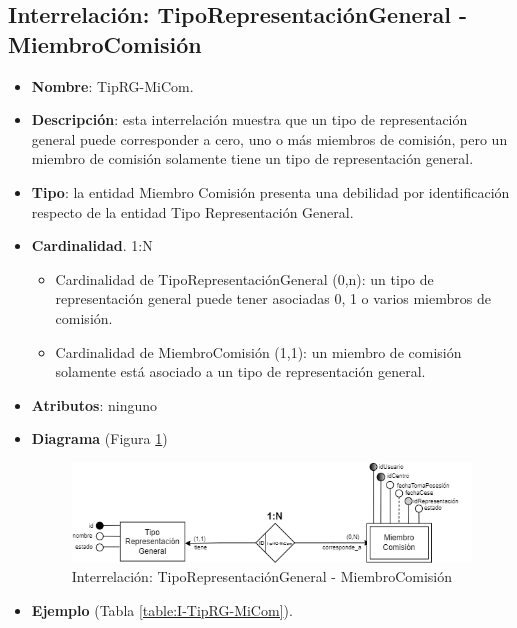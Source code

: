 \subsection{Interrelación: TipoRepresentaciónGeneral - MiembroComisión}
\begin{itemize}
    \item \textbf{Nombre}: TipRG-MiCom.
    \item \textbf{Descripción}: esta interrelación muestra que un tipo de representación general puede corresponder a cero, uno o más miembros de comisión, pero un miembro de comisión solamente tiene un tipo de representación general.
    \item \textbf{Tipo}: la entidad Miembro Comisión presenta una debilidad por identificación respecto de la entidad Tipo Representación General.
    \item \textbf{Cardinalidad}. 1:N
    \begin{itemize}
        \item Cardinalidad de TipoRepresentaciónGeneral (0,n): un tipo de representación general puede tener asociadas 0, 1 o varios miembros de comisión.
        \item Cardinalidad de MiembroComisión (1,1): un miembro de comisión solamente está asociado a un tipo de representación general.
    \end{itemize}
    \item \textbf{Atributos}: ninguno
    \item \textbf{Diagrama} (Figura \ref{fig:I-TipRG-MiCom}) 
    \begin{figure}[H]
        \centering
        \includegraphics[scale=0.7]{img/diagramas/EER/I-TipRG-MiCom.png}
        \caption{Interrelación: TipoRepresentaciónGeneral - MiembroComisión}
        \label{fig:I-TipRG-MiCom}
    \end{figure}
    
    \item \textbf{Ejemplo} (Tabla \ref{table:I-TipRG-MiCom}).


\end{itemize}
